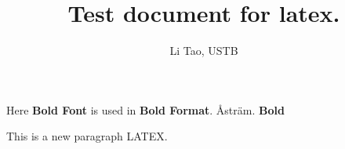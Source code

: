 \documentclass[12pt]{scrbook}
\begin{document}
	\title{Test document for latex. }
	\author{Li Tao, USTB}
	\maketitle
	Here {\bf Bold Font} is used in {\Large \bf Bold Format}.
	\AA str\"am.
	\newpage
	{\bf Bold }\linebreak

	This is a new paragraph
	LATEX.
\end{document}
